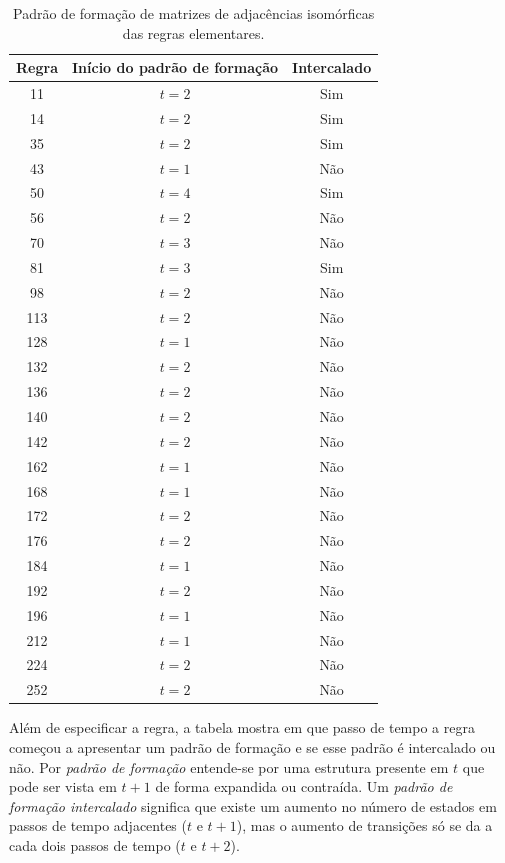 \documentclass[12pt,a4paper]{article}
\begin{document}
\begin{table}[htp]
\begin{center}
\begin{tabular}{|c|c|c|}
\hline
\textbf{Regra} & \textbf{Início do padrão de formação} & \textbf{Intercalado}\\ \hline
 11 & $t=2$ & Sim \\ \hline
 14 & $t=2$ & Sim \\ \hline
 35 & $t=2$ & Sim \\ \hline
 43 & $t=1$ & Não \\ \hline
 50 & $t=4$ & Sim \\ \hline
 56 & $t=2$ & Não \\ \hline
 70 & $t=3$ & Não \\ \hline
 81 & $t=3$ & Sim \\ \hline
 98 & $t=2$ & Não \\ \hline
113 & $t=2$ & Não \\ \hline
128 & $t=1$ & Não \\ \hline
132 & $t=2$ & Não \\ \hline
136 & $t=2$ & Não \\ \hline
140 & $t=2$ & Não \\ \hline
142 & $t=2$ & Não \\ \hline
162 & $t=1$ & Não \\ \hline
168 & $t=1$ & Não \\ \hline
172 & $t=2$ & Não \\ \hline
176 & $t=2$ & Não \\ \hline
184 & $t=1$ & Não \\ \hline
192 & $t=2$ & Não \\ \hline
196 & $t=1$ & Não \\ \hline
212 & $t=1$ & Não \\ \hline
224 & $t=2$ & Não \\ \hline
252 & $t=2$ & Não \\ \hline
\end{tabular}
\caption{Padrão de formação de matrizes de adjacências isomórficas das
regras elementares.}
\label{tab:pattern}
\end{center}
\end{table}

Além de especificar a regra, a tabela mostra em que passo de tempo a regra
começou a apresentar um padrão de formação e se esse padrão é intercalado
ou não. Por \textit{padrão de formação} entende-se por uma estrutura presente em $t$ que
pode ser vista em $t+1$ de forma expandida ou contraída. Um \textit{padrão de
formação intercalado} significa que existe um aumento no número de estados
em passos de tempo adjacentes ($t$ e $t+1$), mas o aumento de transições só se
da a cada dois passos de tempo ($t$ e $t+2$).
\end{document}
